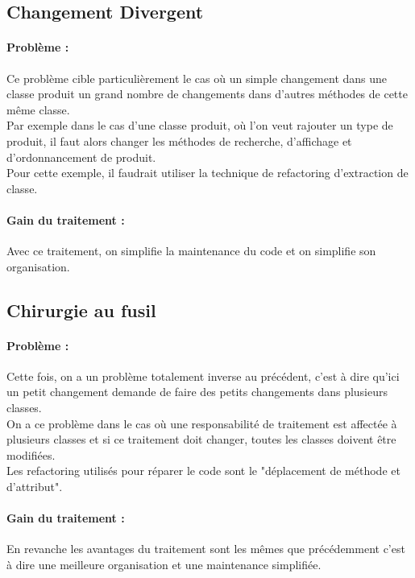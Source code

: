 \documentclass[a4paper,twoside,12pt,openright]{report}
\begin{document}
\subsection{Changement Divergent}
\paragraph{Problème :}
Ce problème cible particulièrement le cas où un simple changement dans une classe produit un grand nombre de changements dans d'autres méthodes de cette même classe.\\
Par exemple dans le cas d'une classe produit, où l'on veut rajouter un type de produit, il faut alors changer les méthodes de recherche, d'affichage et d'ordonnancement de produit.\\
Pour cette exemple, il faudrait utiliser la technique de refactoring d'extraction de classe.\\

\paragraph{Gain du traitement :}
Avec ce traitement, on simplifie la maintenance du code et on simplifie son organisation.\\

\subsection{Chirurgie au fusil}
\paragraph{Problème :}
Cette fois, on a un problème totalement inverse au précédent, c'est à dire qu'ici un petit changement demande de faire des petits changements dans plusieurs classes.\\
On a ce problème dans le cas où une responsabilité de traitement est affectée à plusieurs classes et si ce traitement doit changer, toutes les classes doivent être modifiées.\\
Les refactoring utilisés pour réparer le code sont le "déplacement de méthode et d'attribut".\\

\paragraph{Gain du traitement :}
En revanche les avantages du traitement sont les mêmes que précédemment c'est à dire une meilleure organisation et une maintenance simplifiée.\\
\end{document}
